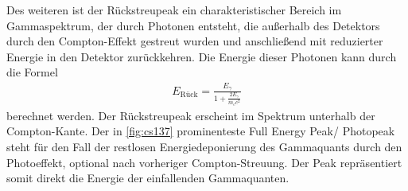 Des weiteren ist der Rückstreupeak ein charakteristischer Bereich im Gammaspektrum, der durch Photonen entsteht, die außerhalb des Detektors durch den Compton-Effekt gestreut wurden und anschließend mit reduzierter Energie in den Detektor zurückkehren. Die Energie dieser Photonen kann durch die Formel
\begin{align} 
E_{\text{Rück}} = \frac{E_\gamma}{1 + \frac{2E_\gamma}{m_e c^2}}
\end{align}
berechnet werden. Der Rückstreupeak erscheint im Spektrum unterhalb der Compton-Kante.
Der in \autoref{fig:cs137} prominenteste Full Energy Peak/ Photopeak steht für den Fall der restlosen Energiedeponierung des Gammaquants durch den Photoeffekt, optional nach vorheriger Compton-Streuung. Der Peak repräsentiert somit direkt die Energie der einfallenden Gammaquanten. 